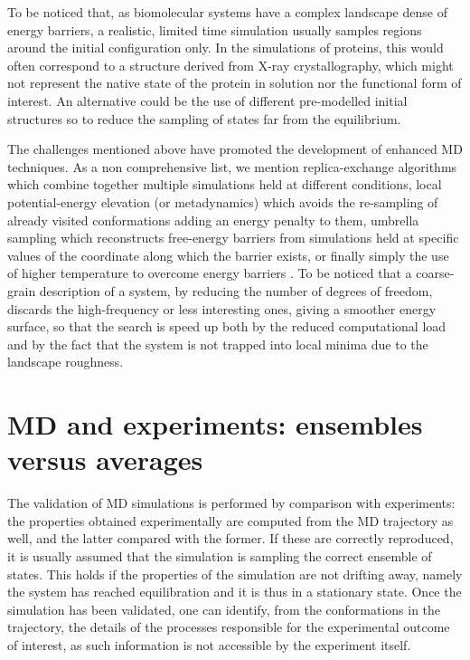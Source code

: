 To be noticed that, as biomolecular systems have a complex landscape dense of energy barriers, a realistic, limited time simulation usually samples regions around the initial configuration only.
%
In the simulations of proteins, this would often correspond to a structure derived from X-ray crystallography, which might not represent the native state of the protein in solution nor the functional form of interest.
%
An alternative could be the use of different pre-modelled initial structures so to reduce the sampling of states far from the equilibrium.

The challenges mentioned above have promoted the development of enhanced MD techniques. As a non comprehensive list, we mention replica-exchange algorithms \cite{Okamoto2004} which combine together multiple simulations held at different conditions, local potential-energy elevation (or metadynamics) \cite{Huber1994,Laio2002} which avoids the re-sampling of already visited conformations adding an energy penalty to them, umbrella sampling \cite{Torrie1977} which reconstructs free-energy barriers from simulations held at specific values of the coordinate along which the barrier exists, or finally simply the use of higher temperature to overcome energy barriers \cite{Kirkpatrick1983}.
%
To be noticed that a coarse-grain description of a system, by reducing the number of degrees of freedom, discards the high-frequency or less interesting ones, giving a smoother energy surface, so that the search is speed up both by the reduced computational load and by the fact that the system is not trapped into local minima due to the landscape roughness.


\section{MD and experiments: ensembles versus averages}
The validation of MD simulations is performed by comparison with experiments: the properties obtained experimentally are computed from the MD trajectory as well, and the latter compared with the former. If these are correctly reproduced, it is usually assumed that the simulation is sampling the correct ensemble of states. This holds if the properties of the simulation are not drifting away, namely the system has reached equilibration and it is thus in a stationary state.
%
Once the simulation has been validated, one can identify, from the conformations in the trajectory, the details of the processes responsible for the experimental outcome of interest, as such information is not accessible by the experiment itself.

